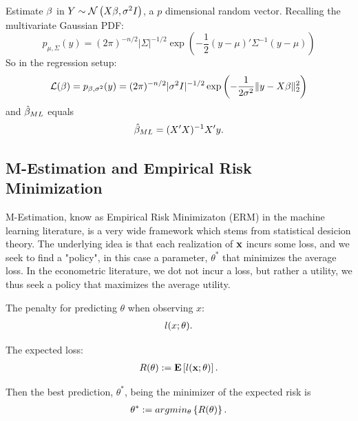 \begin{example}

Estimate $\beta$ in $Y \sim \mathcal{N}\left(X\beta,\sigma^2 I\right)$, a $p$ dimensional random vector.
Recalling the multivariate Gaussian PDF:
$$
  p_{\mu,\Sigma}(y) = 
  (2 \pi)^{-n/2} |\Sigma|^{-1/2} \exp\left(
    -\frac{1}{2} (y-\mu)' \Sigma^{-1} (y-\mu)
  \right)
$$
So in the regression setup:
$$
  \mathcal{L}(\beta)= 
  p_{\beta,\sigma^2}(y) = 
  (2 \pi)^{-n/2} |\sigma^2 I|^{-1/2} \exp\left(
    -\frac{1}{2 \sigma^2} \Vert y-X\beta \Vert_2^2
  \right)
$$
and $\hat{\beta}_{ML}$ equals 
\begin{align}
	\hat{\beta}_{ML}=(X'X)^{-1} X'y.
\end{align}


\end{example}


\subsection{M-Estimation and Empirical Risk Minimization}
\label{sec:m_estimation}

M-Estimation, know as Empirical Risk Minimizaton (ERM) in the machine learning literature, is a very wide framework which stems from statistical desicion theory.
The underlying idea is that each realization of $\mathbf{x}$ incurs some loss, and we seek to find a "policy", in this case a parameter, $\theta^*$ that minimizes the average loss.
In the econometric literature, we dot not incur a loss, but rather a utility, we thus seek a policy that maximizes the average utility.

\begin{definition}
The penalty for predicting $\theta$ when observing $x$: 
\begin{align}
	l(x;\theta).
\end{align}

\end{definition}
\begin{definition}
The expected loss: 
\begin{align}
	R(\theta):=\mathbf{E}\left[ l(\mathbf{x};\theta) \right].
\end{align}

\end{definition}
Then the best prediction, $\theta^*$, being the minimizer of the expected risk is
\begin{align}
\label{eq:risk_min}
 \theta^*:= argmin_{\theta}\left\{ R(\theta) \right\}.
\end{align}

